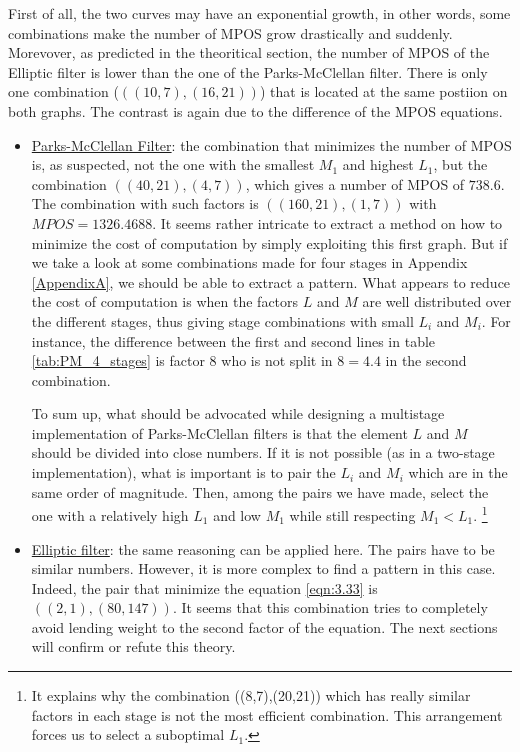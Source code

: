 \newpage
First of all, the two curves may have an exponential growth, in other words, some combinations make the number of MPOS grow drastically and suddenly. Morevover, as predicted in the theoritical section, the number of MPOS of the Elliptic filter is lower than the one of the Parks-McClellan filter. There is only one combination ($((10,7),(16,21))$) that is located at the same postiion on both graphs. The contrast is again due to the difference of the MPOS equations.

\begin{itemize}
	\item \underline{Parks-McClellan Filter}:  the combination that minimizes the number of MPOS is, as suspected, not the one with the smallest $M_1$ and highest $L_1$, but the combination $((40,21),(4,7))$, which gives a number of MPOS of $738.6$. The combination with such factors is $((160,21),(1,7))$ with $MPOS = 1326.4688$. It seems rather intricate to extract a method on how to minimize the cost of computation by simply exploiting this first graph. But if we take a look at some combinations made for four stages in Appendix \ref{AppendixA}, we should be able to extract a pattern. What appears to reduce the cost of computation is when the factors $L$ and $M$ are well distributed over the different stages, thus giving stage combinations with small $L_i$ and $M_i$. For instance, the difference between the first and second lines in table \ref{tab:PM_4_stages} is factor $8$ who is not split in $8 = 4.4$ in the second combination. 
	
	To sum up, what should be advocated while designing a multistage implementation of Parks-McClellan filters is that the element $L$ and $M$ should be divided into close numbers. If it is not possible (as in a two-stage implementation), what is important is to pair the $L_i$ and $M_i$ which are in the same order of magnitude. Then, among the pairs we have made, select the one with a relatively high $L_1$ and low $M_1$ while still respecting $M_1 < L_1$. \footnote{It explains why the combination ((8,7),(20,21)) which has really similar factors in each stage is not the most efficient combination. This arrangement forces us to select a suboptimal $L_1$.}
	
	
	\item \underline{Elliptic filter}: the same reasoning can be applied here. The pairs have to be similar numbers. However, it is more complex to find a pattern in this case. Indeed, the pair that minimize the equation \ref{eqn:3.33} is $((2,1),(80,147))$. It seems that this combination tries to completely avoid lending weight to the second factor of the equation. The next sections will confirm or refute this theory. 
\end{itemize}

